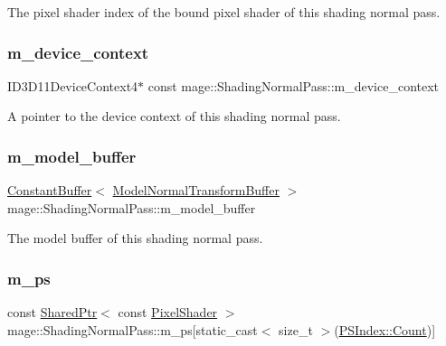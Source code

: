 The pixel shader index of the bound pixel shader of this shading normal pass. \hypertarget{classmage_1_1_shading_normal_pass_a48b0f07fd3f47f40e53e36354879979b}{}\label{classmage_1_1_shading_normal_pass_a48b0f07fd3f47f40e53e36354879979b} 
\subsubsection{\texorpdfstring{m\+\_\+device\+\_\+context}{m\_device\_context}}
{\footnotesize\ttfamily I\+D3\+D11\+Device\+Context4$\ast$ const mage\+::\+Shading\+Normal\+Pass\+::m\+\_\+device\+\_\+context\hspace{0.3cm}{\ttfamily [private]}}

A pointer to the device context of this shading normal pass. \hypertarget{classmage_1_1_shading_normal_pass_a948daea5dea9b2cd2b2eaf30a1341231}{}\label{classmage_1_1_shading_normal_pass_a948daea5dea9b2cd2b2eaf30a1341231} 
\subsubsection{\texorpdfstring{m\+\_\+model\+\_\+buffer}{m\_model\_buffer}}
{\footnotesize\ttfamily \hyperlink{classmage_1_1_constant_buffer}{Constant\+Buffer}$<$ \hyperlink{structmage_1_1_model_normal_transform_buffer}{Model\+Normal\+Transform\+Buffer} $>$ mage\+::\+Shading\+Normal\+Pass\+::m\+\_\+model\+\_\+buffer\hspace{0.3cm}{\ttfamily [private]}}

The model buffer of this shading normal pass. \hypertarget{classmage_1_1_shading_normal_pass_a3dbbd1bd2612ccaec66c551f251a47e9}{}\label{classmage_1_1_shading_normal_pass_a3dbbd1bd2612ccaec66c551f251a47e9} 
\subsubsection{\texorpdfstring{m\+\_\+ps}{m\_ps}}
{\footnotesize\ttfamily const \hyperlink{namespacemage_a1e01ae66713838a7a67d30e44c67703e}{Shared\+Ptr}$<$ const \hyperlink{namespacemage_a27ecaf266420ee7a494d64edc0757129}{Pixel\+Shader} $>$ mage\+::\+Shading\+Normal\+Pass\+::m\+\_\+ps\mbox{[}static\+\_\+cast$<$ size\+\_\+t $>$(\hyperlink{classmage_1_1_shading_normal_pass_a6d277753d26a7854c448b3e0d9275b19ae93f994f01c537c4e2f7d8528c3eb5e9}{P\+S\+Index\+::\+Count})\mbox{]}\hspace{0.3cm}{\ttfamily [private]}}

